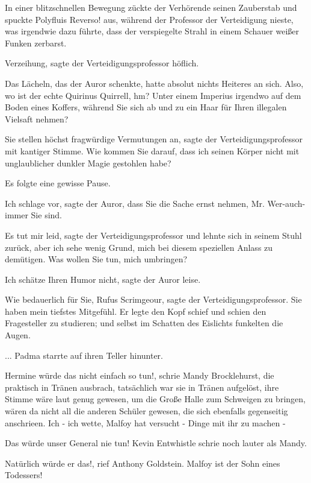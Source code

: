 In einer blitzschnellen Bewegung zückte der Verhörende seinen Zauberstab und
spuckte \glqq Polyfluis Reverso!\grqq{} aus, während der Professor der
Verteidigung nieste, was irgendwie dazu führte, dass der verspiegelte Strahl in
einem Schauer weißer Funken zerbarst.

\glqq Verzeihung\grqq{}, sagte der Verteidigungsprofessor höflich.

Das Lächeln, das der Auror schenkte, hatte absolut nichts Heiteres an sich.
\glqq Also, wo ist der echte Quirinus Quirrell, hm? Unter einem Imperius
irgendwo auf dem Boden eines Koffers, während Sie sich ab und zu ein Haar für
Ihren illegalen Vielsaft nehmen?\grqq{}

\glqq Sie stellen höchst fragwürdige Vermutungen an\grqq{}, sagte der
Verteidigungsprofessor mit kantiger Stimme. \glqq Wie kommen Sie darauf, dass
ich seinen Körper nicht mit unglaublicher dunkler Magie gestohlen habe?\grqq{}

Es folgte eine gewisse Pause.

\glqq Ich schlage vor\grqq{}, sagte der Auror, \glqq dass Sie die Sache ernst
nehmen, Mr. Wer-auch-immer Sie sind.\grqq{}

\glqq Es tut mir leid\grqq{}, sagte der Verteidigungsprofessor und lehnte sich
in seinem Stuhl zurück, \glqq aber ich sehe wenig Grund, mich bei diesem
speziellen Anlass zu demütigen. Was wollen Sie tun, mich umbringen?\grqq{}

\glqq Ich schätze Ihren Humor nicht\grqq{}, sagte der Auror leise.

\glqq Wie bedauerlich für Sie, Rufus Scrimgeour\grqq{}, sagte der
Verteidigungsprofessor. \glqq Sie haben mein tiefstes Mitgefühl.\grqq{} Er legte
den Kopf schief und schien den Fragesteller zu studieren; und selbst im Schatten
des Eislichts funkelten die Augen.


... Padma starrte auf ihren Teller hinunter.

\glqq Hermine würde das nicht einfach so tun!\grqq{}, schrie Mandy Brocklehurst,
die praktisch in Tränen ausbrach, tatsächlich war sie in Tränen aufgelöst, ihre
Stimme wäre laut genug gewesen, um die Große Halle zum Schweigen zu bringen,
wären da nicht all die anderen Schüler gewesen, die sich ebenfalls gegenseitig
anschrieen. \glqq Ich - ich wette, Malfoy hat versucht - Dinge mit ihr zu machen
-\grqq{}

\glqq Das würde unser General nie tun!\grqq{} Kevin Entwhistle schrie noch
lauter als Mandy.

\glqq Natürlich würde er das!\grqq{}, rief Anthony Goldstein. \glqq Malfoy ist
der Sohn eines Todessers!\grqq{}


